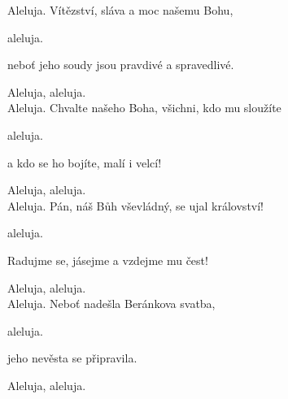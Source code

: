 
Aleluja.
Vítězství, sláva a moc našemu Bohu, 

 aleluja.

neboť jeho soudy jsou pravdivé a spravedlivé. 

 Aleluja, aleluja.\\

Aleluja. 
Chvalte našeho Boha, všichni, kdo mu sloužíte 

 aleluja.

a kdo se ho bojíte, malí i velcí! 

 Aleluja, aleluja.\\

Aleluja. 
Pán, náš Bůh vševládný, se ujal království! 

 aleluja.

Radujme se, jásejme a vzdejme mu čest! 

 Aleluja, aleluja.\\

Aleluja. 
Neboť nadešla Beránkova svatba, 

 aleluja.

jeho nevěsta se připravila. 

 Aleluja, aleluja. 
